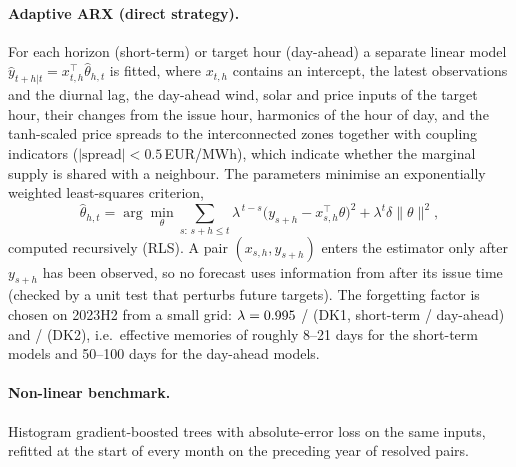 \documentclass[11pt,a4paper]{article}
\begin{document}
\paragraph{Adaptive ARX (direct strategy).}
For each horizon (short-term) or target hour (day-ahead) a separate linear model $\hat y_{t+h|t}=x_{t,h}^\top\hat\theta_{h,t}$ is fitted, where $x_{t,h}$ contains an intercept, the latest observations and the diurnal lag, the day-ahead wind, solar and price inputs of the target hour, their changes from the issue hour, harmonics of the hour of day, and the tanh-scaled price spreads to the interconnected zones together with coupling indicators ($|\text{spread}|<0.5$\,EUR/MWh), which indicate whether the marginal supply is shared with a neighbour.
The parameters minimise an exponentially weighted least-squares criterion,
\begin{equation}
\hat\theta_{h,t}=\arg\min_\theta \sum_{s:\,s+h\le t}\lambda^{\,t-s}\bigl(y_{s+h}-x_{s,h}^\top\theta\bigr)^2+\lambda^{t}\delta\|\theta\|^2,
\end{equation}
computed recursively (RLS). A pair $(x_{s,h},y_{s+h})$ enters the estimator only after $y_{s+h}$ has been observed, so no forecast uses information from after its issue time (checked by a unit test that perturbs future targets).
The forgetting factor is chosen on 2023H2 from a small grid: $\lambda=0.995$ / \DKalamDA{} (DK1, short-term / day-ahead) and \DKblamST{} / \DKblamDA{} (DK2), i.e.\ effective memories of roughly 8--21 days for the short-term models and 50--100 days for the day-ahead models.

\paragraph{Non-linear benchmark.} Histogram gradient-boosted trees with absolute-error loss on the same inputs, refitted at the start of every month on the preceding year of resolved pairs.
\end{document}
